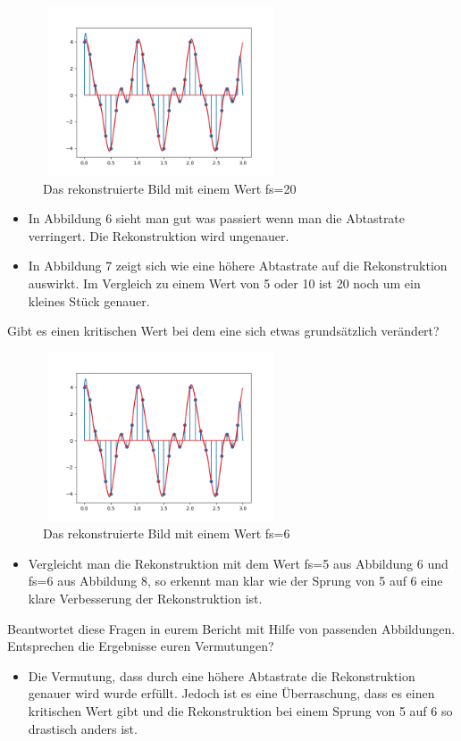 \documentclass[a4paper, 11pt]{article}
\begin{document}
     \begin{figure}[h]
        \centering
        \includegraphics[height=5cm, width = 7cm]{ABild232.png}
        \caption{Das rekonstruierte Bild mit einem Wert fs=20}
      \end{figure}
     
     \begin{itemize}
        \item In Abbildung 6 sieht man gut was passiert wenn man die Abtastrate verringert. Die Rekonstruktion wird ungenauer. 
        \item In Abbildung 7 zeigt sich wie eine höhere Abtastrate auf die Rekonstruktion auswirkt. Im Vergleich zu einem Wert von 5 oder 10 ist 20 noch um ein kleines Stück genauer.
     \end{itemize}
     Gibt es einen kritischen Wert bei dem eine sich etwas grundsätzlich verändert?\\
     
     \begin{figure}[h]
        \centering
        \includegraphics[height=5cm, width = 7cm]{ABild232.png}
        \caption{Das rekonstruierte Bild mit einem Wert fs=6}
      \end{figure}
     \begin{itemize}
        \item Vergleicht man die Rekonstruktion mit dem Wert fs=5 aus Abbildung 6 und fs=6 aus Abbildung 8, so erkennt man klar wie der Sprung von 5 auf 6 eine klare Verbesserung der Rekonstruktion ist.
     \end{itemize}
     Beantwortet diese Fragen in eurem Bericht mit Hilfe von passenden Abbildungen. Entsprechen die Ergebnisse euren Vermutungen?\\
     \begin{itemize}
        \item Die Vermutung, dass durch eine höhere Abtastrate die Rekonstruktion genauer wird wurde erfüllt. Jedoch ist es eine Überraschung, dass es einen kritischen Wert gibt und die Rekonstruktion bei einem Sprung von 5 auf 6 so drastisch anders ist.
     \end{itemize}
\end{document}
